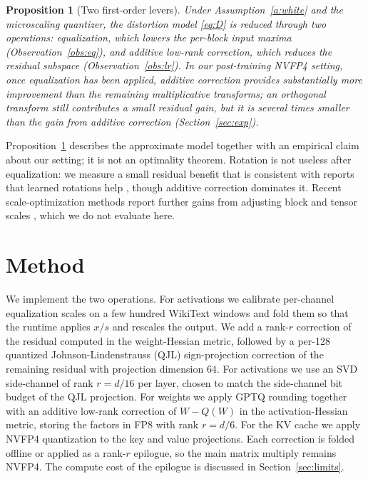 \documentclass[11pt]{article}
\newtheorem{proposition}{Proposition}
\begin{document}
\begin{proposition}[Two first-order levers]\label{prop:main}
Under Assumption~\ref{a:white} and the microscaling quantizer, the distortion model
\eqref{eq:D} is reduced through two operations: equalization, which lowers the per-block
input maxima (Observation~\ref{obs:eq}), and additive low-rank correction, which reduces
the residual subspace (Observation~\ref{obs:lr}). In our post-training NVFP4 setting,
once equalization has been applied, additive correction provides substantially more
improvement than the remaining multiplicative transforms; an orthogonal transform still
contributes a small residual gain, but it is several times smaller than the gain from
additive correction (Section~\ref{sec:exp}).
\end{proposition}

Proposition~\ref{prop:main} describes the approximate model together with an empirical
claim about our setting; it is not an optimality theorem. Rotation is not useless after
equalization: we measure a small residual benefit that is consistent with reports that
learned rotations help \cite{liu2024spinquant}, though additive correction dominates it.
Recent
scale-optimization methods report further gains from adjusting block and tensor scales
\cite{soar2026,fouroversix2025,scalesearch2026}, which we do not evaluate here.

\section{Method}\label{sec:method}
We implement the two operations. For activations we calibrate per-channel equalization
scales on a few hundred WikiText windows and fold them so that the runtime applies $x/s$
and rescales the output. We add a rank-$r$ correction of the residual computed in the
weight-Hessian metric, followed by a per-128 quantized Johnson-Lindenstrauss (QJL)
sign-projection correction of the remaining residual with projection dimension $64$. For
activations we use an SVD side-channel of rank $r=d/16$ per layer, chosen to match the
side-channel bit budget of the QJL projection. For weights we apply GPTQ rounding
\cite{frantar2022gptq} together with an additive low-rank correction of $W - Q(W)$ in
the activation-Hessian metric, storing the factors in FP8 with rank $r=d/6$. For the KV
cache we apply NVFP4 quantization to the key and value projections. Each correction is
folded offline or applied as a rank-$r$ epilogue, so the main matrix multiply remains
NVFP4. The compute cost of the epilogue is discussed in Section~\ref{sec:limits}.
\end{document}
